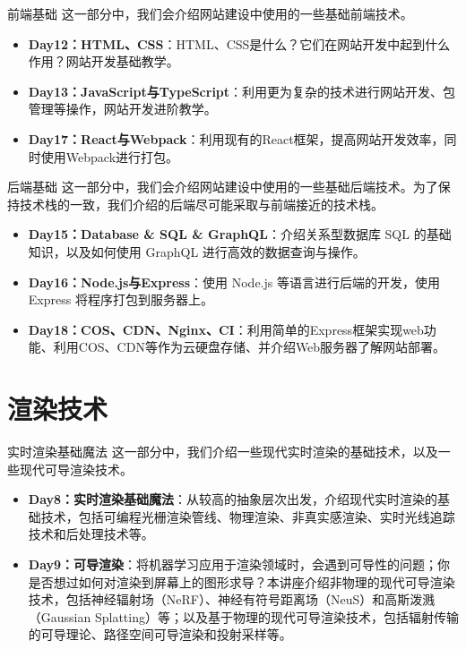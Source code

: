 \documentclass{beamer}
\begin{document}
    \begin{frame}{前端基础}
        这一部分中，我们会介绍网站建设中使用的一些基础前端技术。
        \begin{itemize}
            \item \textbf{Day12：HTML、CSS}：HTML、CSS是什么？它们在网站开发中起到什么作用？网站开发基础教学。
            \item \textbf{Day13：JavaScript与TypeScript}：利用更为复杂的技术进行网站开发、包管理等操作，网站开发进阶教学。
            \item \textbf{Day17：React与Webpack}：利用现有的React框架，提高网站开发效率，同时使用Webpack进行打包。
        \end{itemize}
    \end{frame}

    \begin{frame}{后端基础}
        这一部分中，我们会介绍网站建设中使用的一些基础后端技术。为了保持技术栈的一致，我们介绍的后端尽可能采取与前端接近的技术栈。
        \begin{itemize}
            \item \textbf{Day15：Database \& SQL \& GraphQL}：介绍关系型数据库 SQL 的基础知识，以及如何使用 GraphQL 进行高效的数据查询与操作。
            \item \textbf{Day16：Node.js与Express}：使用 Node.js 等语言进行后端的开发，使用 Express 将程序打包到服务器上。
            \item \textbf{Day18：COS、CDN、Nginx、CI}：利用简单的Express框架实现web功能、利用COS、CDN等作为云硬盘存储、并介绍Web服务器了解网站部署。
        \end{itemize}
    \end{frame}

    \section{渲染技术}

    \begin{frame}{实时渲染基础魔法}
        这一部分中，我们介绍一些现代实时渲染的基础技术，以及一些现代可导渲染技术。
        \begin{itemize}
            \item \textbf{Day8：实时渲染基础魔法}：从较高的抽象层次出发，介绍现代实时渲染的基础技术，包括可编程光栅渲染管线、物理渲染、非真实感渲染、实时光线追踪技术和后处理技术等。
            \item \textbf{Day9：可导渲染}：将机器学习应用于渲染领域时，会遇到可导性的问题；你是否想过如何对渲染到屏幕上的图形求导？本讲座介绍非物理的现代可导渲染技术，包括神经辐射场（NeRF）、神经有符号距离场（NeuS）和高斯泼溅（Gaussian Splatting）等；以及基于物理的现代可导渲染技术，包括辐射传输的可导理论、路径空间可导渲染和投射采样等。
        \end{itemize}
    \end{frame}
\end{document}
